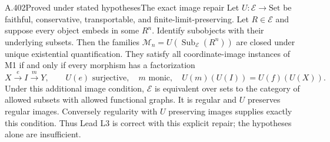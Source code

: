 \begin{saresult}{A.402}{Proved under stated hypotheses}{The exact image repair}
Let $U:\mathcal E\to\mathrm{Set}$ be faithful, conservative,
transportable, and finite-limit-preserving. Let $R\in\mathcal E$ and
suppose every object embeds in some $R^n$. Identify subobjects with
their underlying subsets. Then the families
$\mathcal M_n=U(\operatorname{Sub}_{\mathcal E}(R^n))$ are closed under
unique existential quantification. They satisfy all coordinate-image
instances of M1 if and only if every morphism has a factorization
\[
 X\xrightarrow{e} I\xrightarrow{m}Y,
 \qquad U(e)\text{ surjective},\quad m\text{ monic},\quad
 U(m)(U(I))=U(f)(U(X)).
\]
Under this additional image condition, $\mathcal E$ is equivalent over
sets to the category of allowed subsets with allowed functional graphs.
It is regular and $U$ preserves regular images. Conversely regularity
with $U$ preserving images supplies exactly this condition. Thus Lead L3
is correct with this explicit repair; the hypotheses alone are insufficient.
\end{saresult}
